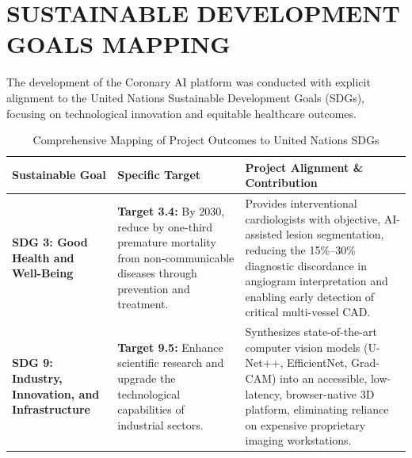 \chapter{SUSTAINABLE DEVELOPMENT GOALS MAPPING}
\label{app:appendix_b}

The development of the Coronary AI platform was conducted with explicit alignment to the United Nations Sustainable Development Goals (SDGs), focusing on technological innovation and equitable healthcare outcomes.

\begin{table}[H]
\centering
\caption{Comprehensive Mapping of Project Outcomes to United Nations SDGs}
\label{tab:sdg_mapping}
\small
\begin{tabular}{p{2.5cm}p{4.5cm}p{6.5cm}}
\toprule
\textbf{Sustainable Goal} & \textbf{Specific Target} & \textbf{Project Alignment \& Contribution} \\
\midrule
\textbf{SDG 3: Good Health and Well-Being} & \textbf{Target 3.4:} By 2030, reduce by one-third premature mortality from non-communicable diseases through prevention and treatment. & Provides interventional cardiologists with objective, AI-assisted lesion segmentation, reducing the 15\%--30\% diagnostic discordance in angiogram interpretation and enabling early detection of critical multi-vessel CAD. \\
\midrule
\textbf{SDG 9: Industry, Innovation, and Infrastructure} & \textbf{Target 9.5:} Enhance scientific research and upgrade the technological capabilities of industrial sectors. & Synthesizes state-of-the-art computer vision models (U-Net++, EfficientNet, Grad-CAM) into an accessible, low-latency, browser-native 3D platform, eliminating reliance on expensive proprietary imaging workstations. \\
\bottomrule
\end{tabular}
\end{table}
